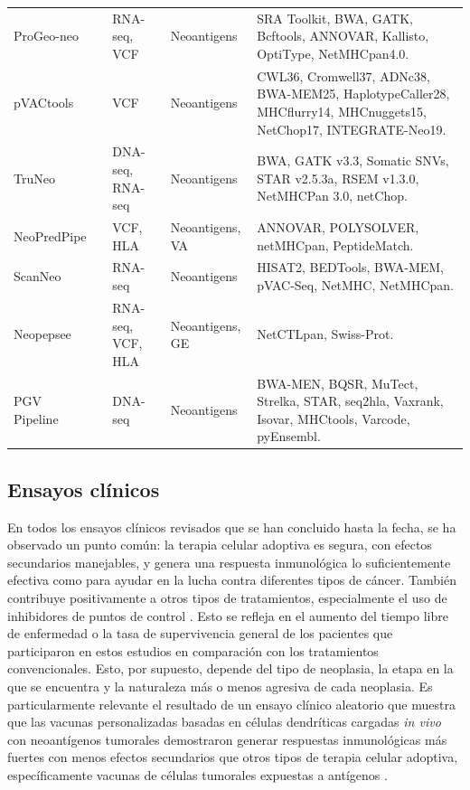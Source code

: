 \begin{table}[h]
{{\begin{tabular}{lp{2cm}p{2cm}p{2cm}p{5cm}}
				ProGeo-neo & \cite{li2020progeo} & RNA-seq, VCF & Neoantigens & SRA Toolkit, BWA, GATK, Bcftools, ANNOVAR, Kallisto, OptiType, NetMHCpan4.0. \\
				pVACtools & \cite{hundal2020pvactools} & VCF & Neoantigens & CWL36, Cromwell37, ADNc38, BWA-MEM25, HaplotypeCaller28, MHCflurry14, MHCnuggets15, NetChop17, INTEGRATE-Neo19. \\
				TruNeo &  \cite{tang2020truneo} & DNA-seq, RNA-seq & Neoantigens & BWA, GATK v3.3, Somatic SNVs, STAR v2.5.3a, RSEM v1.3.0, NetMHCPan 3.0, netChop. \\
				NeoPredPipe & \cite{schenck2019neopredpipe} & VCF, HLA & Neoantigens, VA & ANNOVAR, POLYSOLVER, netMHCpan, PeptideMatch. \\
				ScanNeo & \cite{wang2019scanneo} & RNA-seq  & Neoantigens & HISAT2, BEDTools, BWA-MEM, pVAC-Seq, NetMHC, NetMHCpan. \\
				Neopepsee & \cite{kim2018neopepsee} & RNA-seq, VCF, HLA & Neoantigens, GE & NetCTLpan, Swiss-Prot. \\ 
				PGV Pipeline & \cite{rubinsteyn2018computational}& DNA-seq & Neoantigens & BWA-MEN, BQSR, MuTect, Strelka, STAR, seq2hla, Vaxrank, Isovar, MHCtools, Varcode, pyEnsembl. \\
			\end{tabular}
		}
	}
\end{table}


\subsection{Ensayos clínicos}


En todos los ensayos clínicos revisados que se han concluido hasta la fecha, se ha observado un punto común: la terapia celular adoptiva es segura, con efectos secundarios manejables, y genera una respuesta inmunológica lo suficientemente efectiva como para ayudar en la lucha contra diferentes tipos de cáncer. También contribuye positivamente a otros tipos de tratamientos, especialmente el uso de inhibidores de puntos de control \citep{awad2022personalized, ott2020phase, holm2022neoantigen, rocconi2022proof, poran2020combined, bassani2019phase}. Esto se refleja en el aumento del tiempo libre de enfermedad o la tasa de supervivencia general de los pacientes que participaron en estos estudios en comparación con los tratamientos convencionales. Esto, por supuesto, depende del tipo de neoplasia, la etapa en la que se encuentra y la naturaleza más o menos agresiva de cada neoplasia. Es particularmente relevante el resultado de un ensayo clínico aleatorio que muestra que las vacunas personalizadas basadas en células dendríticas cargadas \textit{in vivo} con neoantígenos tumorales demostraron generar respuestas inmunológicas más fuertes con menos efectos secundarios que otros tipos de terapia celular adoptiva, específicamente vacunas de células tumorales expuestas a antígenos \citep{dillman2018randomized}.

